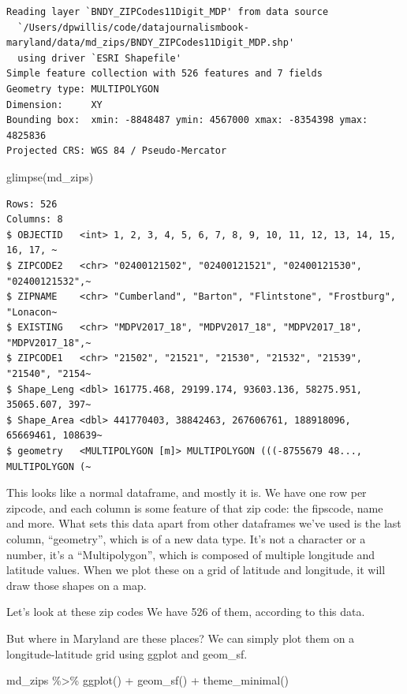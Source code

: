 \documentclass[
  letterpaper,
  DIV=11,
  numbers=noendperiod]{scrreprt}
\newenvironment{Shaded}{\begin{snugshade}}{\end{snugshade}}
\newcommand{\FunctionTok}[1]{\textcolor[rgb]{0.28,0.35,0.67}{#1}}
\newcommand{\NormalTok}[1]{\textcolor[rgb]{0.00,0.23,0.31}{#1}}
\newcommand{\SpecialCharTok}[1]{\textcolor[rgb]{0.37,0.37,0.37}{#1}}
\begin{document}
\begin{verbatim}
Reading layer `BNDY_ZIPCodes11Digit_MDP' from data source 
  `/Users/dpwillis/code/datajournalismbook-maryland/data/md_zips/BNDY_ZIPCodes11Digit_MDP.shp' 
  using driver `ESRI Shapefile'
Simple feature collection with 526 features and 7 fields
Geometry type: MULTIPOLYGON
Dimension:     XY
Bounding box:  xmin: -8848487 ymin: 4567000 xmax: -8354398 ymax: 4825836
Projected CRS: WGS 84 / Pseudo-Mercator
\end{verbatim}

\begin{Shaded}
\begin{Highlighting}[]
\FunctionTok{glimpse}\NormalTok{(md\_zips)}
\end{Highlighting}
\end{Shaded}

\begin{verbatim}
Rows: 526
Columns: 8
$ OBJECTID   <int> 1, 2, 3, 4, 5, 6, 7, 8, 9, 10, 11, 12, 13, 14, 15, 16, 17, ~
$ ZIPCODE2   <chr> "02400121502", "02400121521", "02400121530", "02400121532",~
$ ZIPNAME    <chr> "Cumberland", "Barton", "Flintstone", "Frostburg", "Lonacon~
$ EXISTING   <chr> "MDPV2017_18", "MDPV2017_18", "MDPV2017_18", "MDPV2017_18",~
$ ZIPCODE1   <chr> "21502", "21521", "21530", "21532", "21539", "21540", "2154~
$ Shape_Leng <dbl> 161775.468, 29199.174, 93603.136, 58275.951, 35065.607, 397~
$ Shape_Area <dbl> 441770403, 38842463, 267606761, 188918096, 65669461, 108639~
$ geometry   <MULTIPOLYGON [m]> MULTIPOLYGON (((-8755679 48..., MULTIPOLYGON (~
\end{verbatim}

This looks like a normal dataframe, and mostly it is. We have one row
per zipcode, and each column is some feature of that zip code: the
fipscode, name and more. What sets this data apart from other dataframes
we've used is the last column, ``geometry'', which is of a new data
type. It's not a character or a number, it's a ``Multipolygon'', which
is composed of multiple longitude and latitude values. When we plot
these on a grid of latitude and longitude, it will draw those shapes on
a map.

Let's look at these zip codes We have 526 of them, according to this
data.

But where in Maryland are these places? We can simply plot them on a
longitude-latitude grid using ggplot and geom\_sf.

\begin{Shaded}
\begin{Highlighting}[]
\NormalTok{md\_zips }\SpecialCharTok{\%\textgreater{}\%}
  \FunctionTok{ggplot}\NormalTok{() }\SpecialCharTok{+}
  \FunctionTok{geom\_sf}\NormalTok{() }\SpecialCharTok{+}
  \FunctionTok{theme\_minimal}\NormalTok{()}
\end{Highlighting}
\end{Shaded}
\end{document}
